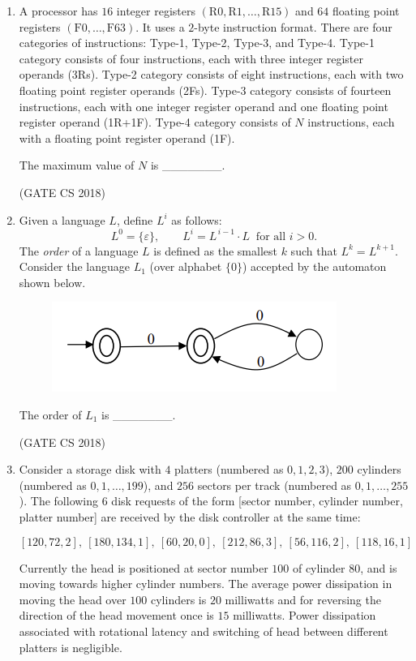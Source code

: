 \documentclass[12pt]{article}
\begin{document}
\begin{enumerate}
(GATE CS 2018)

\item A processor has $16$ integer registers $(\mathrm{R0}, \mathrm{R1},\ldots,\mathrm{R15})$ and $64$ floating point registers $(\mathrm{F0},\ldots,\mathrm{F63})$. It uses a $2$-byte instruction format. There are four categories of instructions: Type-1, Type-2, Type-3, and Type-4. Type-1 category consists of four instructions, each with three integer register operands (3Rs). Type-2 category consists of eight instructions, each with two floating point register operands (2Fs). Type-3 category consists of fourteen instructions, each with one integer register operand and one floating point register operand (1R+1F). Type-4 category consists of $N$ instructions, each with a floating point register operand (1F).

The maximum value of $N$ is \_\_\_\_\_\_\_.

(GATE CS 2018)

\item Given a language $L$, define $L^i$ as follows:
$$
L^0=\{\varepsilon\},\qquad L^i=L^{\,i-1}\cdot L\ \text{ for all } i>0.
$$
The \emph{order} of a language $L$ is defined as the smallest $k$ such that $L^k=L^{k+1}$. Consider the language $L_1$ (over alphabet $\{0\}$) accepted by the automaton shown below.

\begin{figure}[H]
    \centering
    \includegraphics[width=0.5\columnwidth]{figs/ass6_a_q52.png}
    \caption{}
    \label{fig:placeholder}
\end{figure}

The order of $L_1$ is \_\_\_\_\_\_\_.

(GATE CS 2018)


\item Consider a storage disk with $4$ platters (numbered as $0,1,2,3$), $200$ cylinders (numbered as $0,1,\ldots,199$), and $256$ sectors per track (numbered as $0,1,\ldots,255$). The following $6$ disk requests of the form [sector number, cylinder number, platter number] are received by the disk controller at the same time:  

$$
[120,72,2],\ [180,134,1],\ [60,20,0],\ [212,86,3],\ [56,116,2],\ [118,16,1]
$$

Currently the head is positioned at sector number $100$ of cylinder $80$, and is moving towards higher cylinder numbers. The average power dissipation in moving the head over $100$ cylinders is $20$ milliwatts and for reversing the direction of the head movement once is $15$ milliwatts. Power dissipation associated with rotational latency and switching of head between different platters is negligible.  


\end{enumerate}
\end{document}
